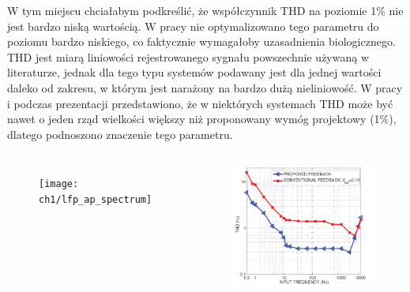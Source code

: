 \begin{frame}[t]
    \vspace{-1em}
    \begin{block}{\dk}
    \end{block}
\vspace{-1em}
    {\renewcommand\normalsize{\scriptsize}%
    \normalsize
        W tym miejscu chciałabym podkreślić, że współczynnik THD na poziomie 1\% nie jest bardzo niską wartością. 
        W pracy nie optymalizowano tego parametru do poziomu bardzo niskiego, co faktycznie wymagałoby uzasadnienia biologicznego. 
        THD jest miarą liniowości rejestrowanego sygnału powszechnie używaną w literaturze, jednak dla tego typu systemów podawany jest dla jednej wartości daleko od zakresu, w którym jest narażony na bardzo dużą nieliniowość. 
        W pracy i podczas prezentacji przedstawiono, że w niektórych systemach THD może być nawet o jeden rząd wielkości większy niż proponowany wymóg projektowy (1\%), dlatego podnoszono znaczenie tego parametru.
    }

    \begin{columns}
        \begin{figure}[H]
            \centering
            \texttt{[image: ch1/lfp\_ap\_spectrum]}  
            \end{figure}	
        \begin{figure}[H]
            \centering
            \includegraphics[scale=0.17]{Figures/genovTHD.png}
        \end{figure}
    \vspace{-1em}


\end{columns}
\end{frame}
